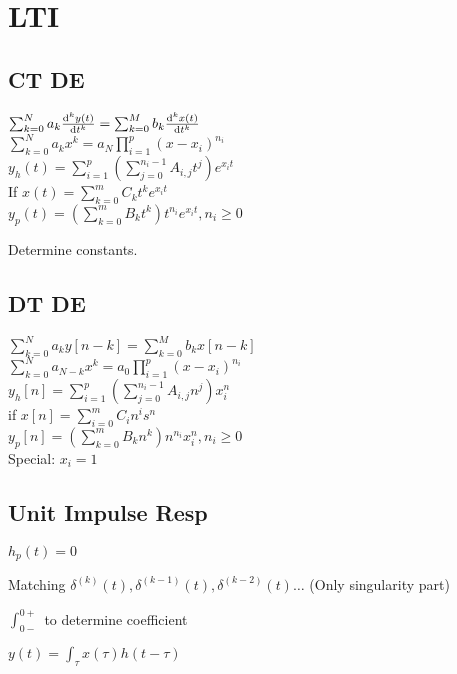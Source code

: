 \section{LTI}
\subsection*{CT DE}
$\sum_{k=0}^{N}a_k\frac{\mathrm{d}^k y(t)}{\mathrm{d} t^k}=\sum_{k=0}^{M} b_k\frac{\mathrm{d}^k x(t)}{\mathrm{d} t^k}$\\
$\sum_{k=0}^{N} a_k x^k = a_N \prod_{i=1}^p (x-x_i)^{n_i}$\\
$y_h(t) = \sum_{i=1}^{p} (\sum_{j=0}^{n_i-1} A_{i,j} t^j) e^{x_it}$\\
If $x(t)=\sum_{k=0}^{m} C_kt^ke^{x_i t}$\\
$y_p(t)=(\sum_{k=0}^{m} B_kt^k)t^{n_i} e^{x_it}, n_i\ge 0$

Determine constants.
\subsection*{DT DE}
$\sum_{k=0}^{N} a_k y[n-k] = \sum_{k=0}^{M} b_k x[n-k]$\\ 
$\sum_{k=0}^N a_{N-k} x^k = a_0\prod_{i=1}^p (x-x_i)^{n_i}$\\
$y_h[n] = \sum_{i=1}^{p} (\sum_{j=0}^{n_i-1} A_{i,j} n^j) x_i^{n}$\\
if $x[n] = \sum_{i=0}^m C_i n^i s^n$\\
$y_p[n]=(\sum_{k=0}^{m} B_kn^k)n^{n_i}x_i^n , n_i\ge 0$\\
Special: $x_i=1$
\subsection*{Unit Impulse Resp}

$h_p(t) = 0$

Matching $\delta^{(k)}(t), \delta^{(k-1)}(t), \delta^{(k-2)}(t)
\ldots$ (Only singularity part)

$\int_{0-}^{0+}$ to determine coefficient

$y(t)=\int_{\tau} x(\tau)  h(t-\tau)$
